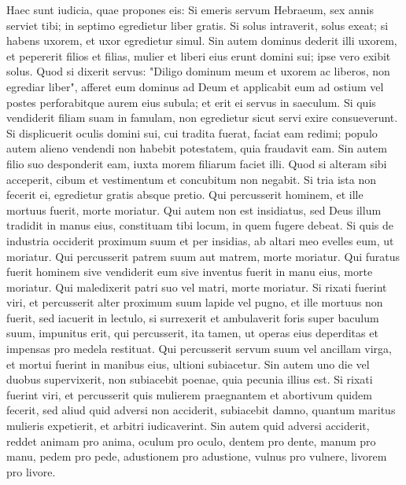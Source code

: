 \begin{biblechapter}  
\verse Haec sunt iudicia, quae propones eis: 
\verse Si emeris servum Hebraeum, sex annis serviet tibi; in septimo egredietur liber gratis. 
\verse Si solus intraverit, solus exeat; si habens uxorem, et uxor egredietur simul. 
\verse Sin autem dominus dederit illi uxorem, et pepererit filios et filias, mulier et liberi eius erunt domini sui; ipse vero exibit solus. 
\verse Quod si dixerit servus: "Diligo dominum meum et uxorem ac liberos, non egrediar liber", 
\verse afferet eum dominus ad Deum et applicabit eum ad ostium vel postes perforabitque aurem eius subula; et erit ei servus in saeculum. 
\verse Si quis vendiderit filiam suam in famulam, non egredietur sicut servi exire consueverunt. 
\verse Si displicuerit oculis domini sui, cui tradita fuerat, faciat eam redimi; populo autem alieno vendendi non habebit potestatem, quia fraudavit eam. 
\verse Sin autem filio suo desponderit eam, iuxta morem filiarum faciet illi. 
\verse Quod si alteram sibi acceperit, cibum et vestimentum et concubitum non negabit. 
\verse Si tria ista non fecerit ei, egredietur gratis absque pretio. 
\verse Qui percusserit hominem, et ille mortuus fuerit, morte moriatur. 
\verse Qui autem non est insidiatus, sed Deus illum tradidit in manus eius, constituam tibi locum, in quem fugere debeat. 
\verse Si quis de industria occiderit proximum suum et per insidias, ab altari meo evelles eum, ut moriatur. 
\verse Qui percusserit patrem suum aut matrem, morte moriatur. 
\verse Qui furatus fuerit hominem sive vendiderit eum sive inventus fuerit in manu eius, morte moriatur. 
\verse Qui maledixerit patri suo vel matri, morte moriatur. 
\verse Si rixati fuerint viri, et percusserit alter proximum suum lapide vel pugno, et ille mortuus non fuerit, sed iacuerit in lectulo, 
\verse si surrexerit et ambulaverit foris super baculum suum, impunitus erit, qui percusserit, ita tamen, ut operas eius deperditas et impensas pro medela restituat. 
\verse Qui percusserit servum suum vel ancillam virga, et mortui fuerint in manibus eius, ultioni subiacetur. 
\verse Sin autem uno die vel duobus supervixerit, non subiacebit poenae, quia pecunia illius est. 
\verse Si rixati fuerint viri, et percusserit quis mulierem praegnantem et abortivum quidem fecerit, sed aliud quid adversi non acciderit, subiacebit damno, quantum maritus mulieris expetierit, et arbitri iudicaverint. 
\verse Sin autem quid adversi acciderit, reddet animam pro anima, 
\verse oculum pro oculo, dentem pro dente, manum pro manu, pedem pro pede, 
\verse adustionem pro adustione, vulnus pro vulnere, livorem pro livore. 

\end{biblechapter}
